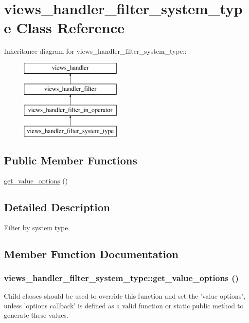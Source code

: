 \hypertarget{classviews__handler__filter__system__type}{
\section{views\_\-handler\_\-filter\_\-system\_\-type Class Reference}
\label{classviews__handler__filter__system__type}
}
Inheritance diagram for views\_\-handler\_\-filter\_\-system\_\-type::\begin{figure}[H]
\begin{center}
\leavevmode
\includegraphics[height=4cm]{classviews__handler__filter__system__type}
\end{center}
\end{figure}
\subsection*{Public Member Functions}
\begin{DoxyCompactItemize}
\item 
\hyperlink{classviews__handler__filter__system__type_a9866d8a2d9ed8dd850a1d69c78eefa7b}{get\_\-value\_\-options} ()
\end{DoxyCompactItemize}


\subsection{Detailed Description}
Filter by system type. 

\subsection{Member Function Documentation}
\hypertarget{classviews__handler__filter__system__type_a9866d8a2d9ed8dd850a1d69c78eefa7b}{
\subsubsection[{get\_\-value\_\-options}]{\setlength{\rightskip}{0pt plus 5cm}views\_\-handler\_\-filter\_\-system\_\-type::get\_\-value\_\-options ()}}
\label{classviews__handler__filter__system__type_a9866d8a2d9ed8dd850a1d69c78eefa7b}
Child classes should be used to override this function and set the 'value options', unless 'options callback' is defined as a valid function or static public method to generate these values.

